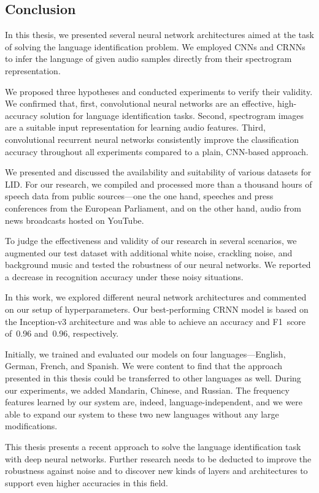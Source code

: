 \subsection{Conclusion}
In this thesis, we presented several neural network architectures aimed at the task of solving the language identification problem. We employed CNNs and CRNNs to infer the language of given audio samples directly from their spectrogram representation. 

We proposed three hypotheses and conducted experiments to verify their validity. We confirmed that, first, convolutional neural networks are an effective, high-accuracy solution for language identification tasks. Second, spectrogram images are a suitable input representation for learning audio features. Third, convolutional recurrent neural networks consistently improve the classification accuracy throughout all experiments compared to a plain, CNN-based approach.

We presented and discussed the availability and suitability of various datasets for LID. For our research, we compiled and processed more than a thousand hours of speech data from public sources---one the one hand, speeches and press conferences from the European Parliament, and on the other hand, audio from news broadcasts hosted on YouTube.

To judge the effectiveness and validity of our research in several scenarios, we augmented our test dataset with additional white noise, crackling noise, and background music and tested the robustness of our neural networks. We reported a decrease in recognition accuracy under these noisy situations.

In this work, we explored different neural network architectures and commented on our setup of hyperparameters. Our best-performing CRNN model is based on the Inception-v3 architecture and was able to achieve an accuracy and F1~score of~\num{0.96} and~\num{0.96}, respectively.

Initially, we trained and evaluated our models on four languages---English, German, French, and Spanish. We were content to find that the approach presented in this thesis could be transferred to other languages as well. During our experiments, we added Mandarin, Chinese, and Russian. The frequency features learned by our system are, indeed, language-independent, and we were able to expand our system to these two new languages without any large modifications.

This thesis presents a recent approach to solve the language identification task with deep neural networks. Further research needs to be deducted to improve the robustness against noise and to discover new kinds of layers and architectures to support even higher accuracies in this field. 

